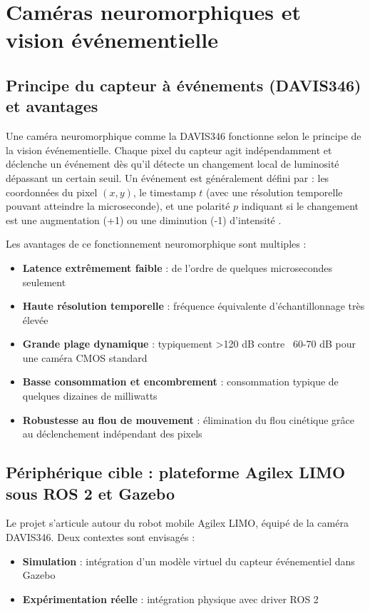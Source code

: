 \section{Caméras neuromorphiques et vision événementielle}
\subsection{Principe du capteur à événements (DAVIS346) et avantages}
Une caméra neuromorphique comme la DAVIS346 fonctionne selon le principe de la vision événementielle. Chaque pixel du capteur agit indépendamment et déclenche un événement dès qu'il détecte un changement local de luminosité dépassant un certain seuil. Un événement est généralement défini par : les coordonnées du pixel $(x,y)$, le timestamp $t$ (avec une résolution temporelle pouvant atteindre la microseconde), et une polarité $p$ indiquant si le changement est une augmentation (+1) ou une diminution (-1) d'intensité \cite{bugueno2025human}.

Les avantages de ce fonctionnement neuromorphique sont multiples :
\begin{itemize}
\item \textbf{Latence extrêmement faible} : de l'ordre de quelques microsecondes seulement \cite{zhu2023dynamic}
\item \textbf{Haute résolution temporelle} : fréquence équivalente d'échantillonnage très élevée
\item \textbf{Grande plage dynamique} : typiquement >120 dB contre ~60-70 dB pour une caméra CMOS standard
\item \textbf{Basse consommation et encombrement} : consommation typique de quelques dizaines de milliwatts
\item \textbf{Robustesse au flou de mouvement} : élimination du flou cinétique grâce au déclenchement indépendant des pixels
\end{itemize}

\subsection{Périphérique cible : plateforme Agilex LIMO sous ROS 2 et Gazebo}
Le projet s'articule autour du robot mobile Agilex LIMO, équipé de la caméra DAVIS346. Deux contextes sont envisagés :
\begin{itemize}
\item \textbf{Simulation} : intégration d'un modèle virtuel du capteur événementiel dans Gazebo \cite{hbp2024gazebo}
\item \textbf{Expérimentation réelle} : intégration physique avec driver ROS 2 \cite{rosevent2024libcaer}
\end{itemize}

